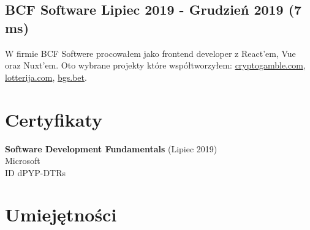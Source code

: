\documentclass[10pt]{article}
\begin{document}
\subsection{BCF Software Lipiec 2019 - Grudzień 2019 (7 ms) }
W firmie BCF Softwere procowałem jako frontend developer z React'em, Vue oraz Nuxt'em. Oto wybrane projekty które współtworzyłem:
    \href{https://cryptogamble.com}{cryptogamble.com}, \href{https://lotterija.com}{lotterija.com}, \href{https://bgs.bet}{bgs.bet}.
\section{Certyfikaty}
\Large \textbf{Software Development Fundamentals} (Lipiec 2019) \vspace{0.3em}\\
\large Microsoft \vspace{0.5em} \\
\small ID dPYP-DTRs \\
\newpage
\section{Umiejętności}
\end{document}
